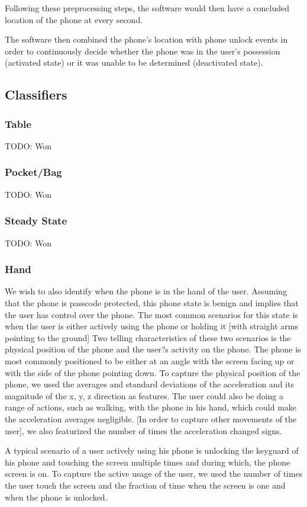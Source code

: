 \documentclass{article}
\begin{document}
Following these preprocessing steps, the software would then have a concluded location of the phone at every second.

The software then combined the phone's location with phone unlock events in order to continuously decide whether the phone was in
the user's possession (activated state) or it was unable to be determined (deactivated state).


\subsection{Classifiers}
\subsubsection{Table}
TODO: Won
\subsubsection{Pocket/Bag}
TODO: Won
\subsubsection{Steady State}
TODO: Won
\subsubsection{Hand}
We wish to also identify when the phone is in the hand of the user.
 Assuming that the phone is passcode protected, this phone state is benign and implies that the user has control over the phone. 
The most common scenarios for this state is when the user is either actively using the phone or holding it [with straight arms pointing to the ground]
 Two telling characteristics of these two scenarios is the physical position of the phone and the user?s activity on the phone. 
The phone is most commonly positioned to be either at an angle with the screen facing up or with the side of the phone pointing down. 
To capture the physical position of the phone, we used the averages and standard deviations of the  acceleration and its magnitude of the x, y, z direction as features. 
The user could also be doing a range of actions, such as walking, with the phone in his hand, which could make the acceleration averages negligible. 
[In order to capture other movements of the user], we also featurized the number of times the acceleration changed signs. 

A typical scenario of a user actively using his phone is unlocking the keyguard of his phone and touching the screen multiple times and during which, the phone screen is on. 
To capture the active usage of the user, we used the number of times the user touch the screen and the fraction of time when the screen is one and when the phone is unlocked. 
\end{document}
